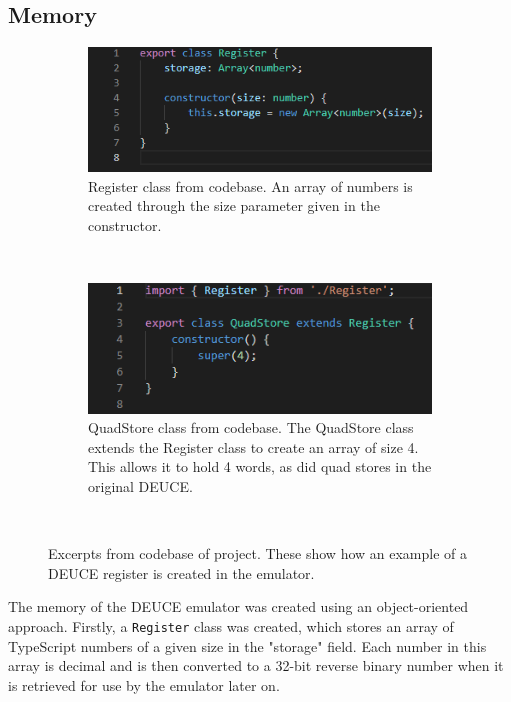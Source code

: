 \documentclass{l4proj}
\begin{document}
\subsection{Memory}
\begin{figure}[h]
	\centering
	\begin{subfigure}[t]{0.45\textwidth}
		\includegraphics[width=\textwidth]{images/register-class}
		\caption{Register class from codebase. An array of numbers is created through the size parameter given in the constructor.}
		\label{fig:reg-class}
	\end{subfigure}
	\quad
	~ %
	\begin{subfigure}[t]{0.45\textwidth}
		\includegraphics[width=\textwidth]{images/quad-store-class}
		\caption{QuadStore class from codebase. The QuadStore class extends the Register class to create an array of size 4. This allows it to hold 4 words, as did quad stores in the original DEUCE.}
		\label{fig:quad-class}
	\end{subfigure}
	~ %
	\caption{Excerpts from codebase of project. These show how an example of a DEUCE register is created in the emulator.}
	\label{fig:mem-classes}
\end{figure}
The memory of the DEUCE emulator was created using an object-oriented approach. Firstly, a \texttt{Register} class was created, which stores an array of TypeScript numbers of a given size in the "storage" field. Each number in this array is decimal and is then converted to a 32-bit reverse binary number when it is retrieved for use by the emulator later on. 
\end{document}
